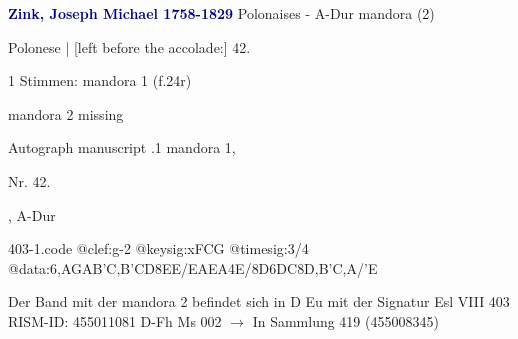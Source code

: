 \documentclass[twocolumn]{book}
\begin{document}
\newline \par \vspace{7pt} \textcolor{darkblue}{\textbf{Zink, Joseph Michael  1758-1829}}
\newline Polonaises - A-Dur
\newline mandora (2)
\newline \begin{itshape}[f.24v, at left:] Polonese | [left before the accolade:] 42.\end{itshape} 
\newline \textcolor{darkblue}{}  1 Stimmen: mandora 1  (f.24r)
\newline \begin{small} mandora 2 missing\end{small} 
\newline Autograph manuscript
.1  mandora 1, \begin{itshape}Nr. 42.\end{itshape}, A-Dur  
\begin{filecontents*}{403-1.code}
@clef:g-2
@keysig:xFCG
@timesig:3/4
@data:{6,AGAB}{'C,B}{'CD}{8EE}/EAEA4E/{8D6DC}8D,B'C,A/'E
\end{filecontents*}
\newline
%
\newline Der Band mit der mandora 2 befindet sich in D Eu mit der Signatur Esl VIII 403
\newline RISM-ID: 455011081
\newline D-Fh  Ms 002
\newline $\rightarrow$ In Sammlung 419 (455008345)
      
\end{document}
